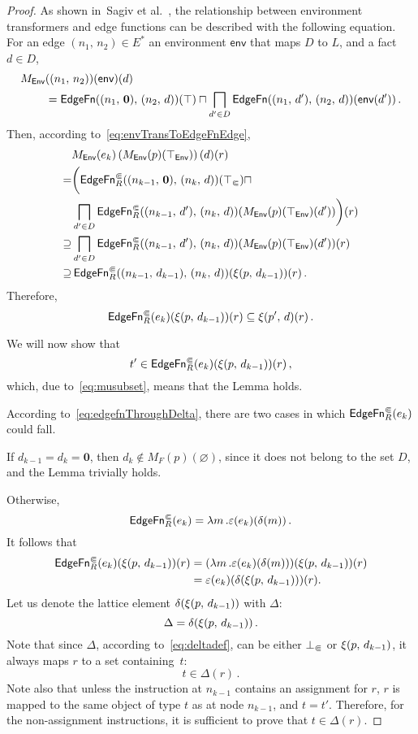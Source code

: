 \begin{proof}
As shown in~Sagiv et al.~\cite{sagiv1996precise}, the relationship between environment transformers and edge functions can be described with the following equation. For an edge $(n_1,\,n_2)\in E^*$ an environment $\textsf{env}$ that maps $D$ to $L$, and a fact $d\in D$,
\begin{align}\label{eq:envTransToEdgeFnEdge}
  M_\textsf{Env}&((n_1,\,n_2))(\textsf{env})(d)\notag\\
  &=\textsf{EdgeFn}((n_1,\,\mathbf0),\,(n_2,\,d))(\top)\sqcap\bigsqcap_{d'\in D}\textsf{EdgeFn}((n_1,\,d'),\,(n_2,\,d))(\textsf{env}(d'))\,.
\end{align}  
Then, according to~\eqref{eq:envTransToEdgeFnEdge},
  \begin{align*}
    &M_\textsf{Env}(e_k)\left(M_\textsf{Env}(p)(\top_\textsf{Env})\right)(d)(r)\\
      =&\bigg(\textsf{EdgeFn}^\Subset_{R}((n_{k-1},\,\mathbf0),\,(n_k,\,d))(\top_\Subset)\sqcap\\
       &\bigsqcap_{d'\in D}\textsf{EdgeFn}^\Subset_{R}((n_{k-1},\,d'),\,(n_k,\,d))(M_\textsf{Env}(p)(\top_\textsf{Env})(d'))\bigg)(r)\\
      \supseteq&
        \bigsqcap_{d'\in D}\textsf{EdgeFn}^\Subset_{R}((n_{k-1},\,d'),\,(n_k,\,d))(M_\textsf{Env}(p)(\top_\textsf{Env})(d'))(r)\\
      \supseteq&\,\textsf{EdgeFn}^\Subset_{R}((n_{k-1},\,d_{k-1}),\,(n_k,\,d))(\xi(p,\,d_{k-1}))(r)\,.
  \end{align*}
  Therefore, 
  \begin{equation}\label{eq:musubset}
    \textsf{EdgeFn}^\Subset_{R}(e_k)(\xi(p,\,d_{k-1}))(r)\subseteq\xi(p',\,d)(r)\,.
  \end{equation}
  
  We will now show that
  \[
    t'\in\textsf{EdgeFn}^\Subset_{R}(e_k)(\xi(p,\,d_{k-1}))(r)\,,
  \]
  which, due to~\eqref{eq:musubset}, means that the Lemma holds.
  
  According to~\eqref{eq:edgefnThroughDelta}, there are two cases in which $\textsf{EdgeFn}^\Subset_{R}(e_k)$ could fall.

  If $d_{k-1}=d_k=\mathbf0$, then $d_k\notin M_F(p)(\varnothing)$, since it does not belong to the set $D$, and the Lemma trivially holds.
  
  Otherwise, 
  \[
    \textsf{EdgeFn}^\Subset_{R}(e_k)=\lambda m\,.\varepsilon(e_k)(\delta(m))\,.
  \]
  It follows that
  \begin{align}\label{eq:efek}
    \textsf{EdgeFn}^\Subset_{R}(e_k)(\xi(p,\,d_{k-1}))(r)
    &=(\lambda m\,.\varepsilon(e_k)(\delta(m)))(\xi(p,\,d_{k-1}))(r)\notag\\
    &=\varepsilon(e_k)(\delta(\xi(p,\,d_{k-1})))(r).
  \end{align}
  Let us denote the lattice element $\delta(\xi(p,\,d_{k-1}))$ with $\Delta$:
  \[
    \Delta=\delta(\xi(p,\,d_{k-1}))\,.
  \]
  Note that since $\Delta$, according to~\eqref{eq:deltadef}, can be either $\bot_\Subset$ or $\xi(p,\,d_{k-1})$, it always maps $r$ to a set containing~$t$:
  \begin{equation}\label{eq:deltaContainsT}
    t\in\Delta(r)\,.
  \end{equation}
  Note also that unless the instruction at $n_{k-1}$ contains an assignment for $r$, $r$ is mapped to the same object of type $t$ as at node $n_{k-1}$, and $t=t'$. Therefore, for the non-assignment instructions, it is sufficient to prove that $t\in\Delta(r)$.
 

\end{proof}
